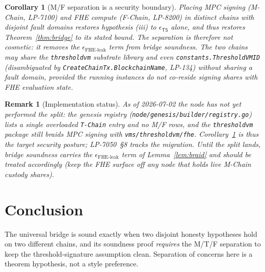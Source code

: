\documentclass[11pt]{article}
\newtheorem{corollary}[theorem]{Corollary}
\newtheorem{remark}[theorem]{Remark}
\begin{document}
\begin{corollary}[M/F separation is a security boundary]
\label{cor:separation}
Placing MPC signing (M-Chain, LP-7100) and FHE compute (F-Chain,
LP-8200) in \emph{distinct} chains with \emph{disjoint} fault domains
restores hypothesis (iii) to $\epsilon_{\mathsf{TS}}$ alone, and thus
restores Theorem~\ref{thm:bridge} to its stated bound. The separation is
therefore not cosmetic: it removes the $\epsilon_{\mathrm{FHE\text{-}leak}}$
term from bridge soundness. The two chains may share the
\texttt{thresholdvm} substrate \emph{library} and even
\texttt{constants.ThresholdVMID} (disambiguated by
\texttt{CreateChainTx.BlockchainName}, LP-134) without sharing a fault
domain, provided the running instances do not co-reside signing shares
with FHE evaluation state.
\end{corollary}

\begin{remark}[Implementation status]
\label{rem:impl-status}
As of 2026-07-02 the node has not yet performed the split: the genesis
registry (\texttt{node/genesis/builder/registry.go}) lists a single
overloaded \texttt{T-Chain} entry and no M/F rows, and the
\texttt{thresholdvm} package still braids MPC signing with
\texttt{vms/thresholdvm/fhe}. Corollary~\ref{cor:separation} is thus the
\emph{target} security posture; LP-7050~\S8 tracks the migration. Until
the split lands, bridge soundness carries the
$\epsilon_{\mathrm{FHE\text{-}leak}}$ term of Lemma~\ref{lem:braid} and
should be treated accordingly (keep the FHE surface off any node that
holds live M-Chain custody shares).
\end{remark}

\section{Conclusion}
The universal bridge is sound exactly when two disjoint honesty
hypotheses hold on two different chains, and its soundness proof
\emph{requires} the M/T/F separation to keep the threshold-signature
assumption clean. Separation of concerns here is a theorem hypothesis,
not a style preference.
\end{document}
